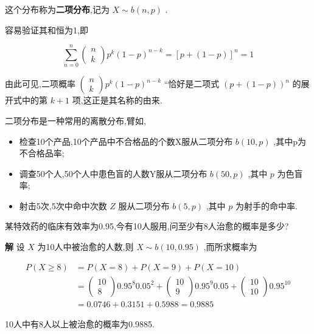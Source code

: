这个分布称为\textbf{二项分布},记为 $ X \sim b(n, p) $ .

容易验证其和恒为1,即

\[
\sum_{n=0}^{n} \left( \begin{array}{l}{n} \\ {k}\end{array}\right) p^{k}(1-p)^{n-k}=[p+(1-p)]^{n}=1
\]

由此可见,二项概率 $ \left( \begin{array}{l}{n} \\ {k}\end{array}\right) p^{k}(1-p)^{n-k} $ “恰好是二项式 $ (p+(1-p))^{n} $ 的展开式中的第 $ k+1 $ 项,这正是其名称的由来.

二项分布是一种常用的离散分布,臂如,

\begin{itemize}
	\item 检查10个产品,10个产品中不合格品的个数X服从二项分布 $ b(10,p) $ ,其中p为不合格品率;
	\item 调查50个人,50个人中患色盲的人数Y服从二项分布 $ b(50,p) $ ,其中 $ p $ 为色盲率;
	\item 射击5次,5次中命中次数 $ Z $ 服从二项分布 $ b(5,p) $ ,其中 $ p $ 为射手的命中率.
\end{itemize}

\begin{example}\label{exam:2.4.1}
	某特效药的临床有效率为0.95,今有10人服用,问至少有8人治愈的概率是多少?
	
	\textbf{解} 设 $ X $ 为10人中被治愈的人数,则 $ X \sim b(10,0.95) $ ,而所求概率为
	
	\[
	\begin{aligned} P(X \geqslant 8) &=P(X=8)+P(X=9)+P(X=10) \\ &=\left( \begin{array}{c}{10} \\ {8}\end{array}\right) 0.95^{8} 0.05^{2}+\left( \begin{array}{c}{10} \\ {9}\end{array}\right) 0.95^{9} 0.05+\left( \begin{array}{c}{10} \\ {10}\end{array}\right) 0.95^{10} \\ &=0.0746+0.3151+0.5988=0.9885 \end{aligned}
	\]
	
	10人中有8人以上被治愈的概率为0.9885.
	
\end{example}

